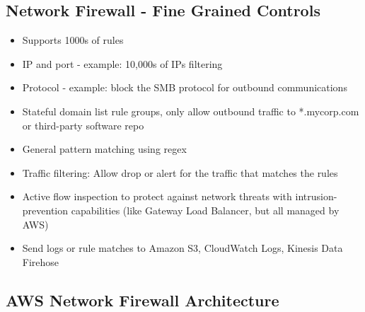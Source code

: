 \subsection{Network Firewall - Fine Grained Controls}
\begin{itemize}
    \item Supports 1000s of rules
    \item IP and port - example: 10,000s of IPs filtering
    \item Protocol - example: block the SMB protocol for outbound communications
    \item Stateful domain list rule groups, only allow outbound traffic to *.mycorp.com or third-party software repo
    \item General pattern matching using regex
    \item Traffic filtering: Allow drop or alert for the traffic that matches the rules
    \item Active flow inspection to protect against network threats with intrusion-prevention capabilities (like Gateway Load Balancer, but all managed by AWS)
    \item Send logs or rule matches to Amazon S3, CloudWatch Logs, Kinesis Data Firehose
\end{itemize}

\subsection{AWS Network Firewall Architecture}
